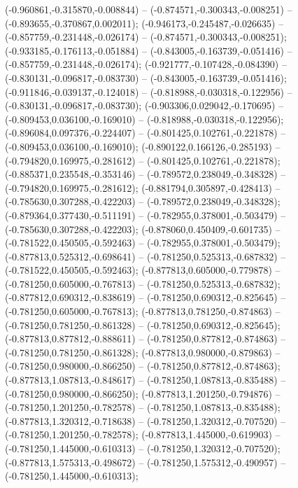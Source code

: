  (-0.960861,-0.315870,-0.008844) -- (-0.874571,-0.300343,-0.008251) -- (-0.893655,-0.370867,0.002011);
 (-0.946173,-0.245487,-0.026635) -- (-0.857759,-0.231448,-0.026174) -- (-0.874571,-0.300343,-0.008251);
 (-0.933185,-0.176113,-0.051884) -- (-0.843005,-0.163739,-0.051416) -- (-0.857759,-0.231448,-0.026174);
 (-0.921777,-0.107428,-0.084390) -- (-0.830131,-0.096817,-0.083730) -- (-0.843005,-0.163739,-0.051416);
 (-0.911846,-0.039137,-0.124018) -- (-0.818988,-0.030318,-0.122956) -- (-0.830131,-0.096817,-0.083730);
 (-0.903306,0.029042,-0.170695) -- (-0.809453,0.036100,-0.169010) -- (-0.818988,-0.030318,-0.122956);
 (-0.896084,0.097376,-0.224407) -- (-0.801425,0.102761,-0.221878) -- (-0.809453,0.036100,-0.169010);
 (-0.890122,0.166126,-0.285193) -- (-0.794820,0.169975,-0.281612) -- (-0.801425,0.102761,-0.221878);
 (-0.885371,0.235548,-0.353146) -- (-0.789572,0.238049,-0.348328) -- (-0.794820,0.169975,-0.281612);
 (-0.881794,0.305897,-0.428413) -- (-0.785630,0.307288,-0.422203) -- (-0.789572,0.238049,-0.348328);
 (-0.879364,0.377430,-0.511191) -- (-0.782955,0.378001,-0.503479) -- (-0.785630,0.307288,-0.422203);
 (-0.878060,0.450409,-0.601735) -- (-0.781522,0.450505,-0.592463) -- (-0.782955,0.378001,-0.503479);
 (-0.877813,0.525312,-0.698641) -- (-0.781250,0.525313,-0.687832) -- (-0.781522,0.450505,-0.592463);
 (-0.877813,0.605000,-0.779878) -- (-0.781250,0.605000,-0.767813) -- (-0.781250,0.525313,-0.687832);
 (-0.877812,0.690312,-0.838619) -- (-0.781250,0.690312,-0.825645) -- (-0.781250,0.605000,-0.767813);
 (-0.877813,0.781250,-0.874863) -- (-0.781250,0.781250,-0.861328) -- (-0.781250,0.690312,-0.825645);
 (-0.877813,0.877812,-0.888611) -- (-0.781250,0.877812,-0.874863) -- (-0.781250,0.781250,-0.861328);
 (-0.877813,0.980000,-0.879863) -- (-0.781250,0.980000,-0.866250) -- (-0.781250,0.877812,-0.874863);
 (-0.877813,1.087813,-0.848617) -- (-0.781250,1.087813,-0.835488) -- (-0.781250,0.980000,-0.866250);
 (-0.877813,1.201250,-0.794876) -- (-0.781250,1.201250,-0.782578) -- (-0.781250,1.087813,-0.835488);
 (-0.877813,1.320312,-0.718638) -- (-0.781250,1.320312,-0.707520) -- (-0.781250,1.201250,-0.782578);
 (-0.877813,1.445000,-0.619903) -- (-0.781250,1.445000,-0.610313) -- (-0.781250,1.320312,-0.707520);
 (-0.877813,1.575313,-0.498672) -- (-0.781250,1.575312,-0.490957) -- (-0.781250,1.445000,-0.610313);
